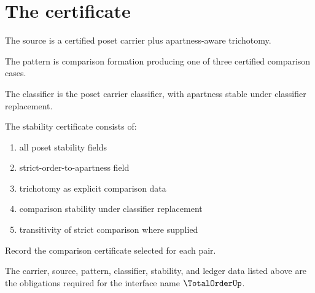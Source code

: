 \section{The certificate}

\begin{definition}
\label{def:totalorder-source-specification}
The source is a certified poset carrier plus apartness-aware trichotomy.
\end{definition}

\begin{definition}
\label{def:totalorder-pattern-specification}
The pattern is comparison formation producing one of three certified comparison cases.
\end{definition}

\begin{definition}
\label{def:totalorder-classifier-specification}
The classifier is the poset carrier classifier, with apartness stable under classifier replacement.
\end{definition}

\begin{definition}
\label{def:totalorder-stability-certificate}
The stability certificate consists of:
\begin{enumerate}
  \item all poset stability fields
  \item strict-order-to-apartness field
  \item trichotomy as explicit comparison data
  \item comparison stability under classifier replacement
  \item transitivity of strict comparison where supplied
\end{enumerate}
\end{definition}

\begin{definition}
\label{def:totalorder-ledger-policy}
Record the comparison certificate selected for each pair.
\end{definition}

\begin{definition}
\label{def:totalorder-certificate-obligations}
The carrier, source, pattern, classifier, stability, and ledger data listed above are the obligations required for the interface name $\TotalOrderUp$.
\end{definition}

